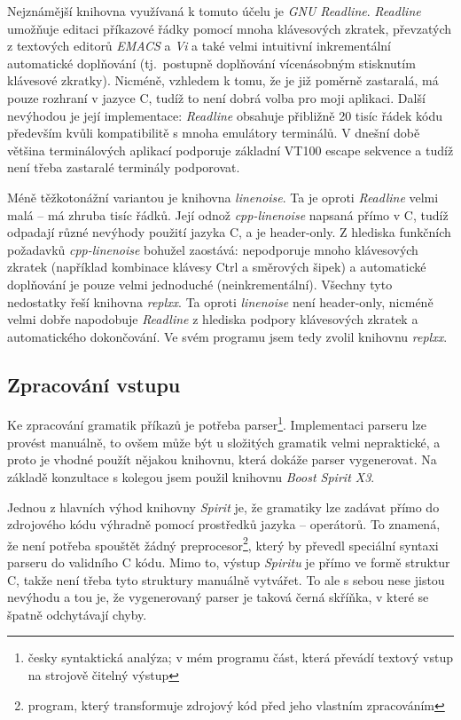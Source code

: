 \documentclass[thesis=B,czech,hidelinks]{FITthesis}[2019/03/06]
\newcommand{\Rplus}{\protect\hspace{-.1em}\protect\raisebox{.35ex}{\smaller{\smaller\textbf{+}}}}
\newcommand{\Cpp}{\mbox{C\Rplus\Rplus}\xspace}
\begin{document}
Nejznámější knihovna využívaná k tomuto účelu je \textit{GNU Readline}. \textit{Readline} umožňuje editaci příkazové řádky pomocí mnoha klávesových zkratek, převzatých z textových editorů \textit{EMACS} a \textit{Vi} a také velmi intuitivní inkrementální automatické doplňování (tj.\ postupně doplňování vícenásobným stisknutím klávesové zkratky). Nicméně, vzhledem k tomu, že je již poměrně zastaralá, má pouze rozhraní v jazyce C, tudíž to není dobrá volba pro moji aplikaci. Další nevýhodou je její implementace: \textit{Readline} obsahuje přibližně 20 tisíc řádek kódu především kvůli kompatibilitě s mnoha emulátory terminálů. V dnešní době většina terminálových aplikací podporuje základní VT100 escape sekvence a tudíž není třeba zastaralé terminály podporovat.

Méně těžkotonážní variantou je knihovna \textit{linenoise}. Ta je oproti \textit{Readline} velmi malá -- má zhruba tisíc řádků. Její odnož \textit{cpp-linenoise} napsaná přímo v \Cpp{}, tudíž odpadají různé nevýhody použití jazyka C, a je header-only. Z hlediska funkčních požadavků \textit{cpp-linenoise} bohužel zaostává: nepodporuje mnoho klávesových zkratek (například kombinace klávesy Ctrl a směrových šipek) a automatické doplňování je pouze velmi jednoduché (neinkrementální).  Všechny tyto nedostatky řeší knihovna \textit{replxx}. Ta oproti \textit{linenoise} není header-only, nicméně velmi dobře napodobuje \textit{Readline} z hlediska podpory klávesových zkratek a automatického dokončování. Ve svém programu jsem tedy zvolil knihovnu \textit{replxx}.


\subsection{Zpracování vstupu}

Ke zpracování gramatik příkazů je potřeba parser\footnote{česky syntaktická analýza; v mém programu část, která převádí textový vstup na strojově čitelný výstup}. Implementaci parseru lze provést manuálně, to ovšem může být u složitých gramatik velmi nepraktické, a proto je vhodné použít nějakou knihovnu, která dokáže parser vygenerovat. Na základě konzultace s kolegou jsem použil knihovnu \textit{Boost Spirit X3}.

Jednou z hlavních výhod knihovny \textit{Spirit} je, že gramatiky lze zadávat přímo do zdrojového kódu výhradně pomocí prostředků jazyka -- operátorů. To znamená, že není potřeba spouštět žádný preprocesor\footnote{program, který transformuje zdrojový kód před jeho vlastním zpracováním}, který by převedl speciální syntaxi parseru do validního \Cpp{} kódu. Mimo to, výstup \textit{Spiritu} je přímo ve formě struktur \Cpp{}, takže není třeba tyto struktury manuálně vytvářet. To ale s sebou nese jistou nevýhodu a tou je, že vygenerovaný parser je taková černá skříňka, v které se špatně odchytávají chyby.
\end{document}
